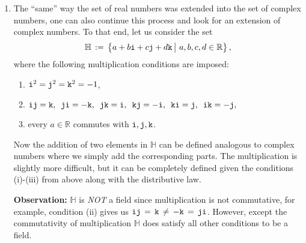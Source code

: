 \documentclass[11pt,table]{article}
\newcommand{\<}			{\langle}
\renewcommand{\>}      		{\rangle}
\newcommand{\bC}		{\mathbb{C}}
\newcommand{\bH}		{\mathbb{H}}
\newcommand{\bR}		{\mathbb{R}}
\begin{document}
\begin{enumerate}
\begin{enumerate}[\rm (a)]
\begin{proof}
	completing the argument that $\phi$ is injective homomorphism. Given the above results we see that the vector space of $1 \times 1$ complex matrices is isomorphic 
	to a subspace of the vector space of $2 \times 2$ real matrcies, this can be generalized to say that 
	$\mathcal{M}_{n \times n}(\bC)$ is isomorphic to a subspace of $\mathcal{M} _{2n \times 2n}(\bR)$, thus we can always rewrite complex matrices as 
	real matrices. 

\end{proof}

\end{enumerate} 


\medskip
\item 
The ``same'' way the set of real numbers 
was extended into the set of complex numbers, 
one can also continue this process and look 
for an extension of complex numbers. 
To that end, let us consider the set 
\begin{equation} \label{eq:quat-def}
\bH \, := \, 
\big\{ 
a + b {\tt i} + c {\tt j} + d {\tt k}  \, \big| \,\, 
a, b, c, d \in \bR 
\big\} \, ,
\end{equation} 
where the following multiplication conditions are imposed: 
\begin{enumerate}[\rm (i)] 
\item 
$ {\tt i}^2 = {\tt j}^2 ={\tt k}^2 = -1$,

\item 
${\tt i}{\tt j}={\tt k}, \,\,\, 
{\tt j}{\tt i}=-{\tt k}, \, \,\,
{\tt j}{\tt k}={\tt i}, \, \,\,
{\tt k}{\tt j}=-{\tt i}, \, \,\,
{\tt k}{\tt i}={\tt j}, \, \,\,
{\tt i}{\tt k}=-{\tt j},$

\item 
every $a\in \bR$ commutes with ${\tt i}, {\tt j}, {\tt k}$.
\end{enumerate} 

Now the addition of two elements in $\bH$ can be defined 
analogous to complex numbers where we simply 
add the corresponding parts. 
The multiplication is slightly more difficult, 
but it can be completely defined given the conditions 
(i)-(iii) from above along with the distributive law. 

\medskip

{\bf Observation:} 
$\bH$ is {\em NOT} a field since multiplication is not commutative, for example, 
condition (ii) gives us $
{\tt i}{\tt j} \, = \, {\tt k} \, \ne \,  -{\tt k} \,=\, {\tt j}{\tt i}$. 
However, except the commutativity of multiplication $\bH$ does satisfy 
all other conditions to be a field. 


\end{enumerate}
\end{document}
